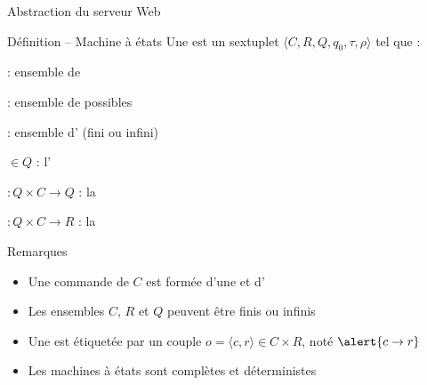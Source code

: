 
\begingroup


\begin{frame}{Abstraction du serveur Web}

  \begin{block}{Définition -- Machine à états}
    Une  est un sextuplet \alert{$\langle C, R, Q, q_0, \tau, \rho \rangle$} tel que :
    \begin{description}[xxx]
    \item[\alert{$C$}] : ensemble de  
      \hfill {\footnotesize {}}
    \item[\alert{$R$}] : ensemble de  possibles
      \hfill {\footnotesize {}}
    \item[\alert{$Q$}] : ensemble d' (fini ou infini)
      \hfill {\footnotesize {}}
    \item[\alert{$q_0$}] $\in Q$ : l'
      \hfill {\footnotesize {}}
    \item[\alert{$\tau$}] $: Q \times C \rightarrow Q$ : la 
      \hfill {\footnotesize{}}
    \item[\alert{$\rho$}] $: Q \times C \rightarrow R$ : la 
      \hfill {\footnotesize{}}
    \end{description}
  \end{block}

  \begin{block}{Remarques}
    \begin{itemize}
    \item Une commande de $C$ est formée d'une  et d'
    \item Les ensembles $C$, $R$ et $Q$ peuvent être finis ou infinis
    \item Une  est étiquetée par un couple $o = \langle c, r\rangle \in C \times R$, noté $\alert{c \rightarrow r}$
    \item Les machines à états sont complètes et déterministes
    \end{itemize}
  \end{block}
  
  
\end{frame}

\endgroup
\endinput


